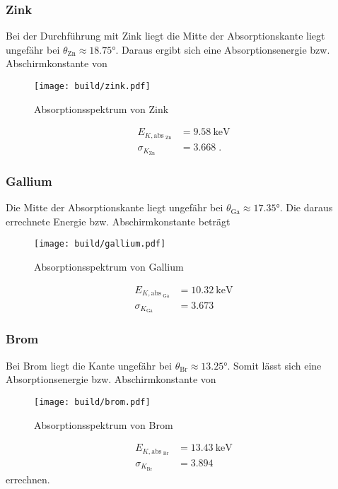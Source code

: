 \subsubsection{Zink}
Bei der Durchführung mit Zink liegt die Mitte der Absorptionskante liegt ungefähr bei $\theta_\text{Zn} \approx \ang{18.75;;}$. Daraus ergibt sich eine Absorptionsenergie bzw. Abschirmkonstante von 
\begin{figure}
    \centering
    \caption{Absorptionsspektrum von Zink}
    \label{fig:zink}
    \texttt{[image: build/zink.pdf]}
\end{figure}
\begin{align*}
    E_{K, \text{abs}_\text{ Zn}}  &= \SI{9.58}{\kilo\electronvolt} \\
    \sigma_{K_\text{Zn}}         &= \num{3.668} \; \text{.}
\end{align*}
\FloatBarrier
\subsubsection{Gallium}
Die Mitte der Absorptionskante liegt ungefähr bei $\theta_\text{Ga} \approx \ang{17.35;;}$. Die daraus errechnete Energie bzw. Abschirmkonstante beträgt
\begin{figure}
    \centering
    \caption{Absorptionsspektrum von Gallium}
    \label{fig:Gallium}
    \texttt{[image: build/gallium.pdf]}
\end{figure}
\begin{align*}
    E_{K, \text{abs}_\text{ Ga}}  &= \SI{10.32}{\kilo\electronvolt} \\
    \sigma_{K_\text{Ga}}                &= \num{3.673}
\end{align*}
\FloatBarrier
\subsubsection{Brom}
Bei Brom liegt die Kante ungefähr bei $\theta_\text{Br} \approx \ang{13.25;;}$. Somit lässt sich eine Absorptionsenergie bzw. Abschirmkonstante von 
\begin{figure}
    \centering
    \caption{Absorptionsspektrum von Brom}
    \label{fig:Brom}
    \texttt{[image: build/brom.pdf]}
\end{figure}
\begin{align*}
    E_{K, \text{abs}_\text{ Br}}  &= \SI{13.43}{\kilo\electronvolt} \\
    \sigma_{K_\text{Br}}                &= \num{3.894}
\end{align*}
errechnen.
\FloatBarrier
